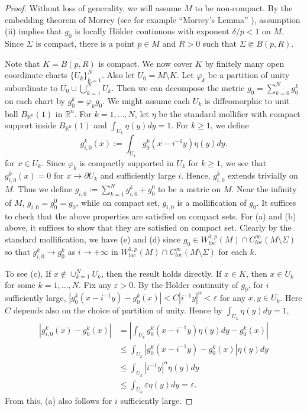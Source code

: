 \documentclass[12pt]{amsart}
\def\e{\varepsilon}
\theoremstyle{plain}
\theoremstyle{plain}
\theoremstyle{definition}
\theoremstyle{remark}
\numberwithin{equation}{subsection}
\begin{document}
\begin{proof}

Without loss of generality, we will assume $M$ to be non-compact.  By the embedding theorem of Morrey (see for example ``Morrey's Lemma''  \cite[(1.3) ]{adams_morrey_2015}), assumption (ii) implies that $g_0$ is locally H\"older continuous with exponent $\delta/p < 1$ on $M$.  Since $\Sigma$ is compact, there is a point $p \in M$ and $R > 0$ such that $\Sigma \Subset B(p,R)$. 

Note that $K=\overline{B(p,R)}$ is compact. We now cover $K$ by finitely many open coordinate charts $\{U_k\}_{k=1}^N$. Also let $U_0 = M \setminus K$. Let $\varphi_k$ be a partition of unity subordinate to $U_0 \cup \bigcup\limits_{k=1}^N U_k$. Then we can decompose the metric $g_0=\sum_{k=0}^N g^k_0$ on each chart by $g_0^k = \varphi_k g_0$. 
We might assume each $U_k$ is diffeomorphic to unit ball $B_{\mathbb{R}^n}(1)$ in $\mathbb{R}^n$. For $k = 1,\dots,N$, let $\eta$ be the standard mollifier with compact support inside $B_{\mathbb{R}^n}(1)$ and $\int_{U_k} \eta(y)dy = 1$. For $k\geq 1$, we define
    \begin{equation*}
        g_{i,0}^k(x) := \int_{U_k} g_0^k(x-i^{-1}y)\eta(y)dy.
    \end{equation*}
    for $x\in U_k$. Since $\varphi_k$ is compactly supported in $U_k$ for $k\geq 1$, we see that $g^k_{i,0}(x)=0$ for $x\to \partial U_k$ and sufficiently large $i$. Hence, $g^k_{i,0}$ extends trivially on $M$. Thus we define
$
        g_{i,0}:= \sum\limits_{k=1}^N g_{i,0}^k + g_0^0$ to be a metric on $M$.
  Near the infinity of $M$, $g_{i,0}=g_0^0=g_0$, while on compact set, $g_{i,0}$ is a mollification of $g_0$. It suffices to check that the above properties are satisfied on compact sets. For (a) and (b) above, it suffices to show that they are satisfied on compact set. Clearly by the standard mollification, we have (e) and (d) since $g_0\in W^{1,p}_{loc}(M)\cap C^\infty_{loc}(M\setminus \Sigma)$ so that $g_{i,0}^k\to g_0^k$ as $i\to+\infty$ in  $W^{1,p}_{loc}(M)\cap C^\infty_{loc}(M\setminus \Sigma)$ for each $k$.
    
To see (c), If $x\notin \cup_{k=1}^N U_k$, then the result holds directly.  If $x \in K$, then $x \in U_k$ for some $k = 1,\dots,N$. Fix any $\e>0$. By the H\"older continuity of $g_0$, for $i$ sufficiently large, $|g_0^k(x-i^{-1}y) - g_0^k(x)| < C|i^{-1}y|^\alpha <\varepsilon$ for any $x, y \in U_k$. Here $C$ depends also on the choice of partition of unity. Hence by $\int_{U_k} \eta(y)dy = 1$,
    \begin{align*}
        |g_{i,0}^k(x) - g_0^k(x)| &= \left|\int_{U_k} g_0^k(x-i^{-1}y)\eta(y)dy - g_0^k(x)\right| \nonumber \\
        &\leq \int_{U_k} | g_0^k(x-i^{-1}y) - g_0^k(x)|\eta(y)dy \nonumber \\
        &\leq \int_{U_k} |i^{-1}y|^\alpha \eta(y)dy \nonumber \\
        &\leq \int_{U_k} \varepsilon \eta(y)dy \nonumber = \varepsilon.
    \end{align*}
    From this, (a) also follows  for $i$ sufficiently large.
    

\end{proof}
\end{document}
